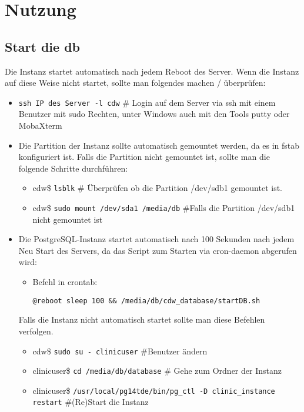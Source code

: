 \chapter{Nutzung}
	   \section{Start die \acs{db}}
	   Die Instanz startet automatisch nach jedem Reboot des Server. Wenn die Instanz auf diese Weise nicht startet, sollte man folgendes machen / überprüfen:
	   \begin{itemize}
	   	\item \texttt{ssh IP des Server -l cdw} \# Login auf dem Server via ssh mit einem Benutzer mit sudo Rechten, unter Windows auch mit den Tools putty oder MobaXterm
	   	\item Die Partition der Instanz sollte automatisch gemountet werden, da es in fstab konfiguriert ist. Falls die Partition nicht gemountet ist, sollte man die folgende Schritte durchführen:
	   	\begin{itemize}
	   	 \item cdw\$ \texttt{lsblk} \# Überprüfen ob die Partition /dev/sdb1 gemountet ist.
	   	 \item cdw\$ \texttt{sudo mount /dev/sda1 /media/db} \#Falls die Partition /dev/sdb1 nicht gemountet ist
	   	\end{itemize}	   	  
	   	\item Die PostgreSQL-Instanz startet automatisch nach 100 Sekunden nach jedem Neu Start des Servers, da das Script zum Starten via cron-daemon abgerufen wird:
	   	\begin{itemize}
	   		\item Befehl in crontab: 
	   		
	   		\texttt{@reboot sleep 100 \&\& /media/db/cdw\_database/startDB.sh}
	   	\end{itemize}
	   	Falls die Instanz nicht automatisch startet sollte man diese Befehlen verfolgen.
	   	\begin{itemize}
	   		\item cdw\$ \texttt{sudo su - clinicuser} \#Benutzer ändern
	   		\item clinicuser\$ \texttt{cd /media/db/database} \# Gehe zum Ordner der  Instanz
	   	    \item clinicuser\$ \texttt{/usr/local/pg14tde/bin/pg\_ctl -D clinic\_instance  restart} \#(Re)Start die Instanz
	   	\end{itemize}
	   \end{itemize}
